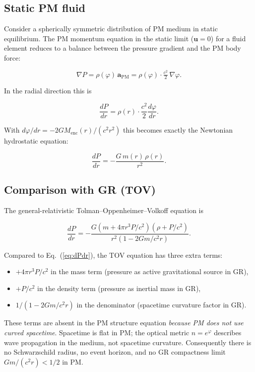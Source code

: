 \documentclass[11pt,a4paper]{article}
\newcommand{\PM}{\text{PM}}
\begin{document}
\subsection{Static PM fluid}

Consider a spherically symmetric distribution of PM medium in static
equilibrium.  The PM momentum equation in the static limit ($\mathbf{u}=0$)
for a fluid element reduces to a balance between the pressure gradient and
the PM body force:

\begin{equation}
  \nabla P = \rho(\varphi)\,\mathbf{a}_\PM = \rho(\varphi)\cdot\tfrac{c^2}{2}\,\nabla\varphi.
  \label{eq:hydrostatic}
\end{equation}

In the radial direction this is

\begin{equation}
  \frac{dP}{dr} = \rho(r)\cdot\frac{c^2}{2}\frac{d\varphi}{dr}.
  \label{eq:hydrostatic_1d}
\end{equation}

With $d\varphi/dr = -2GM_\text{enc}(r)/(c^2 r^2)$ this becomes exactly the
Newtonian hydrostatic equation:

\begin{equation}
  \frac{dP}{dr} = -\frac{G\,m(r)\,\rho(r)}{r^2}.
  \label{eq:dPdr}
\end{equation}

\subsection{Comparison with GR (TOV)}

The general-relativistic Tolman--Oppenheimer--Volkoff equation is

\begin{equation}
  \frac{dP}{dr} = -\frac{G(m + 4\pi r^3 P/c^2)(\rho + P/c^2)}{r^2(1 - 2Gm/c^2r)}.
\end{equation}

Compared to Eq.~(\ref{eq:dPdr}), the TOV equation has three extra terms:
\begin{itemize}
  \item $+4\pi r^3 P/c^2$ in the mass term (pressure as active gravitational source
    in GR),
  \item $+P/c^2$ in the density term (pressure as inertial mass in GR),
  \item $1/(1-2Gm/c^2r)$ in the denominator (spacetime curvature factor in GR).
\end{itemize}
These terms are absent in the PM structure equation \emph{because PM does not
use curved spacetime}.  Spacetime is flat in PM; the optical metric
$n = e^\varphi$ describes wave propagation in the medium, not spacetime
curvature.  Consequently there is no Schwarzschild radius, no event horizon,
and no GR compactness limit $Gm/(c^2r) < 1/2$ in PM.
\end{document}
